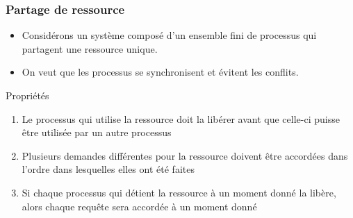 \documentclass[compress]{beamer}
\begin{document}
\begin{frame}
\frametitle{Partage de ressource}
\begin{itemize}
\item Considérons un système composé d'un ensemble fini de processus qui partagent une ressource unique.
\item On veut que les processus se synchronisent et évitent les conflits.
\end{itemize}
\begin{block}{Propriétés}
\begin{enumerate}
\item Le processus qui utilise la ressource doit la libérer avant que celle-ci puisse être utilisée par un autre processus
\item Plusieurs demandes différentes pour la ressource doivent être accordées dans l'ordre dans lesquelles elles ont été faites
\item Si chaque processus qui détient la ressource à un moment donné la libère, alors chaque requête sera accordée à un moment donné
\end{enumerate}
\end{block}
\end{frame}
\end{document}
